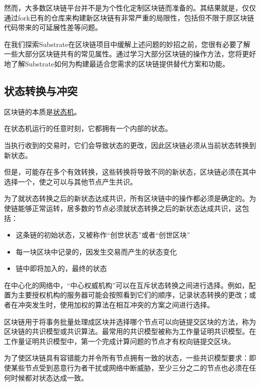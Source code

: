 然而，大多数区块链平台并不是为个性化定制区块链而准备的。其结果就是，仅仅通过fork已有的仓库来构建新区块链有非常严重的局限性，包括但不限于原区块链代码带来的可延展性差等问题。

在我们探索Substrate在区块链项目中缓解上述问题的妙招之前，您很有必要了解一些大部分区块链共有的常见属性。通过学习大部分区块链的操作方法，您将更好地了解Substrate如何为构建最适合您需求的区块链提供替代方案和功能。

\hypertarget{ux72b6ux6001ux8f6cux6362ux4e0eux51b2ux7a81}{%
\subsection{状态转换与冲突}\label{ux72b6ux6001ux8f6cux6362ux4e0eux51b2ux7a81}}

区块链的本质是\href{(https://en.wikipedia.org/wiki/Finite-state_machine)}{状态机}。

在状态机运行的任意时刻，它都拥有一个内部的状态。

当执行收到的交易时，它们会导致状态的更改，因此区块链必须从当前状态转换到新状态。

但是，可能存在多个有效转换，这些转换将导致不同的新状态，区块链必须在其中选择一个，使之可以与其他节点产生共识。

为了就状态转换之后的新状态达成共识，所有区块链中的操作都必须是确定的。为使链能够正常运转，居多数的节点必须就状态转换之后的新状态达成共识，这包括：

\begin{itemize}
\item
  这条链的初始状态，又被称作``创世状态''或者``创世区块''
\item
  每一块区块中记录的，因发生交易而产生的状态变化
\item
  链中即将加入的，最终的状态
\end{itemize}

在中心化的网络中，``中心权威机构''可以在互斥状态转换之间进行选择。例如，配置为主要授权机构的服务器可能会按照看到它们的顺序，记录状态转换的更改；或者在冲突发生时，使用加权的算法在相互冲突的方案之间进行选择。

区块链用于将事务批量处理成区块并选择哪个节点可以向链提交区块的方法，称为区块链的共识模型或共识算法。最常用的共识模型被称为工作量证明共识模型。在工作量证明共识模型中，第一个完成计算问题的节点才有权向链提交区块。

为了使区块链具有容错能力并令所有节点拥有一致的状态，一些共识模型要求：即使某些节点受到恶意行为者干扰或网络中断威胁，至少三分之二的节点也必须在任何时候都对状态达成一致。

